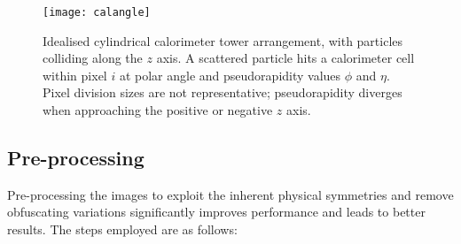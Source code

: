 \documentclass{report}
\begin{document}
\begin{figure}[H]
	\centering
	\texttt{[image: calangle]}
	
	\caption{Idealised cylindrical calorimeter tower arrangement, with particles colliding along the $z$ axis. A scattered particle hits a calorimeter cell within pixel $i$ at polar angle and pseudorapidity values $\phi$ and $\eta$. Pixel division sizes are not representative; pseudorapidity diverges when approaching the positive or negative $z$ axis.}
	\label{fig:calangle}
	
\end{figure}

\subsection{Pre-processing}
\label{sec:preproc}

Pre-processing the images to exploit the inherent physical symmetries and remove obfuscating variations significantly improves performance and leads to better results. The steps employed are as follows:
\end{document}
